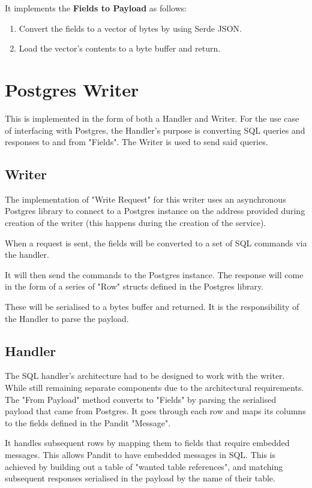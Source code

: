 \documentclass[a4paper,12pt]{report}
\begin{document}
It implements the \textbf{Fields to Payload} as follows:
\begin{enumerate}
    \item Convert the fields to a vector of bytes by using Serde JSON.
    \item Load the vector's contents to a byte buffer and return.
\end{enumerate}

\section{Postgres Writer}
\label{im:postgres}
This is implemented in the form of both a Handler and Writer. 
For the use case of interfacing with Postgres, the Handler's purpose is converting SQL queries and responses to and from "Fields". The Writer is used to send said queries.

\subsection{Writer}
The implementation of "Write Request" for this writer uses an asynchronous Postgres library to connect to a Postgres instance on the address provided during creation of the writer (this happens during the creation of the service).

When a request is sent, the fields will be converted to a set of SQL commands via the handler.

It will then send the commands to the Postgres instance. The response will come in the form of a series of "Row" structs defined in the Postgres library.

These will be serialised to a bytes buffer and returned. It is the responsibility of the Handler to parse the payload.

\subsection{Handler}
The SQL handler's architecture had to be designed to work with the writer. While still remaining separate components due to the architectural requirements.
The "From Payload" method converts to "Fields" by parsing the serialised payload that came from Postgres.
It goes through each row and maps its columns to the fields defined in the Pandit "Message".

It handles subsequent rows by mapping them to fields that require embedded messages. This allows Pandit to have embedded messages in SQL. 
This is achieved by building out a table of "wanted table references", and matching subsequent responses serialised in the payload by the name of their table.
\end{document}
